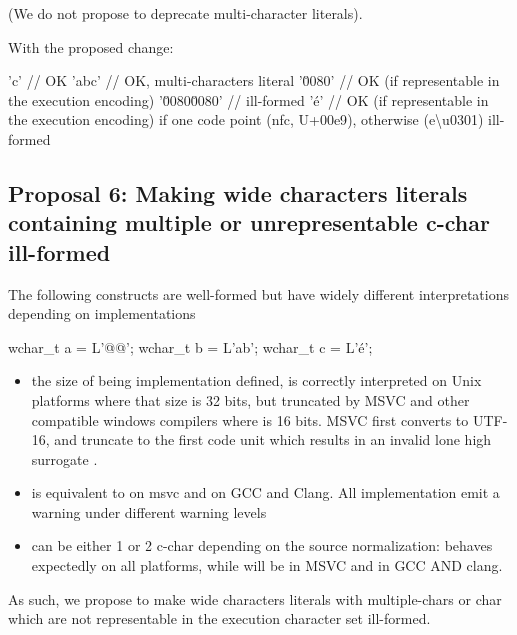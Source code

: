 \documentclass{wg21}
\begin{document}
(We do not propose to deprecate multi-character literals).

With the proposed change:

\begin{colorblock}
'c'   // OK
'abc' // OK, multi-characters literal
'\u0080' // OK (if representable in the execution encoding)
'\u0080\u0080' // ill-formed
'é' // OK (if representable in the execution encoding) if one code point (nfc,  {U+00e9}), otherwise (e\textbackslash u0301) ill-formed

\end{colorblock}



\subsection{Proposal 6: Making wide characters literals containing multiple or unrepresentable c-char ill-formed}

The following constructs are well-formed but have widely different interpretations depending on implementations

\begin{colorblock}
wchar_t a = L'@@';
wchar_t b = L'ab';
wchar_t c = L'é';
\end{colorblock}


\begin{itemize}
\item the size of  being implementation defined,  is correctly interpreted on Unix platforms where that size is 32 bits, but truncated by MSVC and other compatible windows compilers where  is 16 bits.
MSVC first converts to UTF-16, and truncate to the first code unit which results in an invalid lone high surrogate .


\item  {} is equivalent to  on msvc and   on GCC and Clang. All implementation emit a warning under different warning levels 

\item {} can be either 1 or 2 c-char depending on the source normalization:  behaves expectedly on all platforms, 
while   will be  in MSVC and  in GCC AND clang.

\end{itemize}

As such, we propose to make wide characters literals with multiple-chars or char which are not representable in the execution character set ill-formed.
\end{document}
